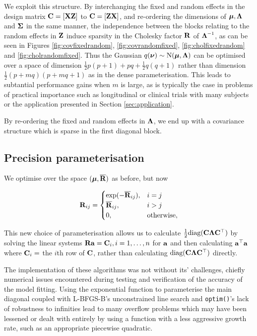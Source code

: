 	\noindent We exploit this structure. By interchanging the fixed and random effects in the design matrix ${\bf C} = [{\bf X} {\bf Z}]$ to ${\bf C} = [{\bf Z} {\bf X}]$, and re-ordering the dimensions of ${\boldsymbol \mu}, {\boldsymbol \Lambda}$ and ${\boldsymbol \Sigma}$ in the same manner, the independence between the
	blocks relating to the random effects in ${\bf Z}$ induce sparsity in the Cholesky factor ${\bf R}$ of
	${\boldsymbol \Lambda}^{-1}$, as can be seen in Figures \ref{fig:covfixedrandom}, \ref{fig:covrandomfixed},
	\ref{fig:cholfixedrandom} and \ref{fig:cholrandomfixed}. Thus the Gaussian $q({\boldsymbol \nu}) \sim \text{N}({\boldsymbol \mu}, {\boldsymbol \Lambda})$ can be optimised over a space of dimension $\frac{1}{2} p (p + 1) + pq + \frac{1}{2} q (q + 1)$ rather than dimension
	$\frac{1}{2} (p + mq) (p + mq + 1)$ as in the dense parameterisation. This leads to subtantial performance gains
	when $m$ is large, as is typically the case in problems of practical importance such as longitudinal or 
	clinical trials with many subjects or the application presented in Section \ref{sec:application}.
			
	By re-ordering the fixed and random effects in ${\boldsymbol \Lambda}$, we end up with a covariance structure which is 
	sparse in the first diagonal block.
	
	\subsection{Precision parameterisation}
	
	We optimise over the space $({\boldsymbol \mu}, \overline{{\bf R}})$ as before, but now 
			
	\begin{equation*}
		{\bf R}_{ij} =
		\begin{cases}
			\exp(-\overline{{\bf R}}_{ij}), & i = j             \\
			\overline{{\bf R}}_{ij},        & i > j             \\
			0,                          & \text{otherwise}, 
		\end{cases}
	\end{equation*}
		
	\noindent This new choice of parameterisation allows us to calculate $\frac{1}{2} \text{diag}({\bf C} {\boldsymbol \Lambda}
	{\bf C}^\top)$ by solving the linear systems ${\bf R} {\bf a} = {\bf C}_{i}, i=1, \ldots, n$ for   ${\bf a}$ and then calculating
	${\bf a}^\top{\bf a}$ where ${\bf C}_{i} = $ the $i$th row of ${\bf C}$, rather than calculating $\text{diag}({\bf C} {\boldsymbol \Lambda}
	{\bf C}^\top)$ directly.
		
	The implementation of these algorithms was not without its' challenges, chiefly numerical issues encountered during testing and verification of the accuracy of the model fitting. Using the exponential function to parameterise the main diagonal coupled with L-BFGS-B's unconstrained line search and \texttt{optim()}'s lack of robustness to infinities lead to many overflow problems which may have been lessened or dealt with entirely by using a function with a less aggressive growth rate, such as an appropriate piecewise quadratic.
		
